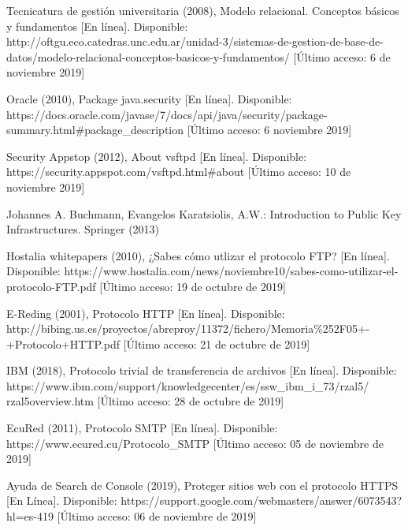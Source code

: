 \documentclass[12pt, a4paper, titlepage]{report}
\begin{document}
\begin{thebibliography}{20}
        Tecnicatura de gestión universitaria (2008), Modelo relacional. Conceptos básicos y fundamentos [En línea]. Disponible:     http://oftgu.eco.catedras.unc.edu.ar/unidad-3/sistemas-de-gestion-de-base-de-datos/modelo-relacional-conceptos-basicos-y-fundamentos/ [Último acceso: 6 de noviembre 2019]
        
        Oracle (2010), Package java.security [En línea]. Disponible:        https://docs.oracle.com/javase/7/docs/api/java/security/package-summary.html\#package\_description [Último acceso: 6 noviembre 2019]
        
        Security Appstop (2012), About vsftpd [En línea]. Disponible:
        https://security.appspot.com/vsftpd.html\#about [Último acceso: 10 de noviembre 2019]
        
        Johannes A. Buchmann, Evangelos Karatsiolis, A.W.: Introduction to Public Key Infrastructures. Springer (2013)
        
        Hostalia whitepapers (2010), ¿Sabes cómo utlizar el protocolo FTP? [En línea]. Disponible: https://www.hostalia.com/news/noviembre10/sabes-como-utilizar-el-protocolo-FTP.pdf [Último acceso: 19 de octubre de 2019]
        
        E-Reding (2001), Protocolo HTTP [En línea]. Disponible: http://bibing.us.es/proyectos/abreproy/11372/fichero/Memoria\%252F05+-+Protocolo+HTTP.pdf [Último acceso: 21 de octubre de 2019]
        
        IBM (2018), Protocolo trivial de transferencia de archivos [En línea]. Disponible: https://www.ibm.com/support/knowledgecenter/es/ssw\_ibm\_i\_73/rzal5/\\rzal5overview.htm [Último acceso: 28 de octubre de 2019]
        
        EcuRed (2011), Protocolo SMTP [En línea]. Disponible: https://www.ecured.cu/Protocolo\_SMTP [Último acceso: 05 de noviembre de 2019] 
        
        Ayuda de Search de Console (2019), Proteger sitios web con el protocolo HTTPS [En Línea]. Disponible: https://support.google.com/webmasters/answer/6073543?hl=es-419 [Último acceso: 06 de noviembre de 2019]
	
	\end{thebibliography}	
\end{document}
